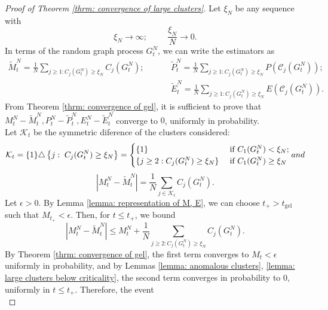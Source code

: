    \begin{proof}[Proof of Theorem \ref{thrm: convergence of large clusters}] Let $\xi_N$ be any sequence with \begin{equation} \xi_N\rightarrow \infty; \hspace{1cm} \frac{\xi_N}{N}\rightarrow 0. \end{equation} In terms of the random graph process $G^N_t$, we can write the estimators as \begin{equation}\begin{split} 
       \widetilde{M}^N_t = \frac{1}{N}\sum_{j\ge 1: C_j(G^N_t)\ge \xi_N} C_j(G^N_t);  \hspace{1cm} &\widetilde{P}^N_t =  \frac{1}{N}\sum_{j\ge 1: C_j(G^N_t)\ge \xi_N} P\left(\mathcal{C}_j(G^N_t)\right);\\[2ex] &\widetilde{E}^N_t =  \frac{1}{N}\sum_{j\ge 1: C_j(G^N_t)\ge \xi_N} E\left(\mathcal{C}_j(G^N_t)\right).
  \end{split} \end{equation} From Theorem \ref{thrm: convergence of gel}, it is sufficient to prove that $M^N_t-\widetilde{M}^N_t, P^N_t-\widetilde{P}^N_t, E^N_t-\widetilde{E}^N_t$ converge to $0$, uniformly in probability. \medskip \\ Let $\mathcal{K}_t$ be the symmetric diference of the clusters considered: \begin{equation}
      \mathcal{K}_t=\{1\}\triangle\left\{j: \hspace{0.1cm}C_j(G^N_t)\ge \xi_N \right\}=\begin{cases} \{1\} & \text{ if } C_1(G^N_t)< \xi_N; \\ \{j\ge 2: C_j(G^N_t) \ge \xi_N\} & \text{ if } C_1(G^N_t) \ge \xi_N \end{cases} and 
  \end{equation} \begin{equation}
          \left|M^N_t-\widetilde{M}^N_t\right|=\frac{1}{N}\sum_{j\in\mathcal{K}_t} C_j(G^N_t). 
      \end{equation} Let $\epsilon>0$. By Lemma \ref{lemma: representation of M, E}, we can choose $t_+>t_\text{gel}$ such that $M_{t_+}<\epsilon.$ Then, for $t\le t_+$, we bound \begin{equation}
          \left|M^N_t-\widetilde{M}^N_t\right| \le M^N_t +\frac{1}{N}\sum_{j\ge 2: C_j(G^N_t)\ge \xi_N} C_j(G^N_t).
      \end{equation} By Theorem \ref{thrm: convergence of gel}, the first term converges to $M_t <\epsilon$ uniformly in probability, and by Lemmas \ref{lemma: anomalous clusters}, \ref{lemma: large clusters below criticality}, the second term converges in probability to $0$, uniformly in $t\le t_+$. Therefore, the event \begin{equation}

\end{equation}
\end{proof}

